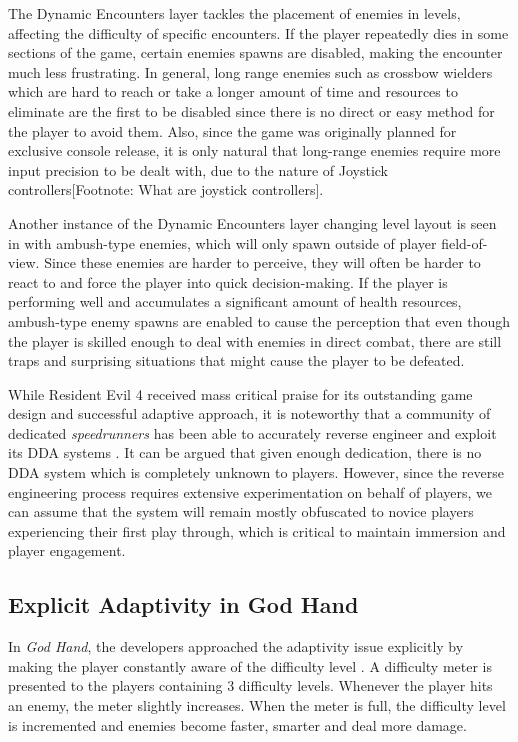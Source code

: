 The Dynamic Encounters layer tackles the placement of enemies in levels, affecting the difficulty of specific encounters. If the player repeatedly dies in some sections of the game, certain enemies spawns are disabled, making the encounter much less frustrating. In general, long range enemies such as crossbow wielders which are hard to reach or take a longer amount of time and resources to eliminate are the first to be disabled since there is no direct or easy method for the player to avoid them. Also, since the game was originally planned for exclusive console release, it is only natural that long-range enemies require more input precision to be dealt with, due to the nature of Joystick controllers[Footnote: What are joystick controllers].

Another instance of the Dynamic Encounters layer changing level layout is seen in with ambush-type enemies, which will only spawn outside of player field-of-view. Since these enemies are harder to perceive, they will often be harder to react to and force the player into quick decision-making. If the player is performing well and accumulates a significant amount of health resources, ambush-type enemy spawns are enabled to cause the perception that even though the player is skilled enough to deal with enemies in direct combat, there are still traps and surprising situations that might cause the player to be defeated.


While Resident Evil 4 received mass critical praise for its outstanding game design and successful adaptive approach, it is noteworthy that a community of dedicated \emph{speedrunners} has been able to accurately reverse engineer and exploit its DDA systems . It can be argued that given enough dedication, there is no DDA system which is completely unknown to players. However, since the reverse engineering process requires extensive experimentation on behalf of players, we can assume that the system will remain mostly obfuscated to novice players experiencing their first play through, which is critical to maintain immersion and player engagement.

\subsection{Explicit Adaptivity in God Hand}

In \emph{God Hand}, the developers approached the adaptivity issue explicitly by making the player constantly aware of the difficulty level \cite{article_subjectivedifficulty}. A difficulty meter is presented to the players containing 3 difficulty levels. Whenever the player hits an enemy, the meter slightly increases. When the meter is full, the difficulty level is incremented and enemies become faster, smarter and deal more damage.

